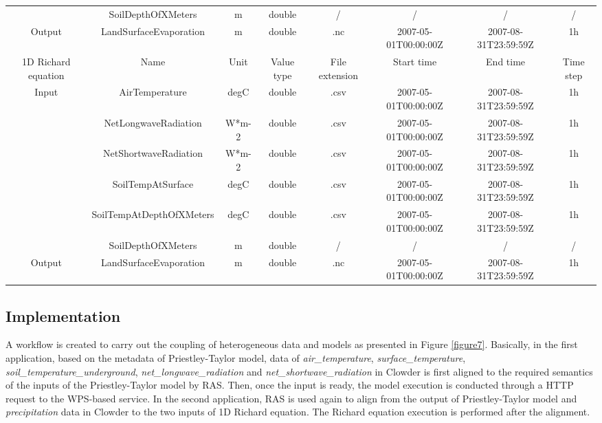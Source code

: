 \documentclass[review]{elsarticle}
\begin{document}
\begin{landscape}
\begin{table}[h]
\begin{tabular}{*8c}
							  &SoilDepthOfXMeters	           & m           & double    & /        & /								  & /								    & /      \\
Output                      &LandSurfaceEvaporation       & m           & double    & .nc     & 2007-05-01T00:00:00Z & 2007-08-31T23:59:59Z & 1h       \\
\midrule
1D Richard equation&Name&Unit &Value type&File extension & Start time & End time & Time step                      \\
\midrule
\multirow{6}{*}{Input}&AirTemperature                     & degC     & double    & .csv   & 2007-05-01T00:00:00Z & 2007-08-31T23:59:59Z & 1h       \\
							  &NetLongwaveRadiation        & W*m-2   & double    & .csv   & 2007-05-01T00:00:00Z & 2007-08-31T23:59:59Z & 1h       \\
							  &NetShortwaveRadiation        & W*m-2  & double    & .csv   & 2007-05-01T00:00:00Z & 2007-08-31T23:59:59Z & 1h       \\
							  &SoilTempAtSurface               & degC     & double    & .csv   & 2007-05-01T00:00:00Z & 2007-08-31T23:59:59Z & 1h       \\
							  &SoilTempAtDepthOfXMeters & degC     & double    & .csv   & 2007-05-01T00:00:00Z & 2007-08-31T23:59:59Z & 1h       \\
							  &SoilDepthOfXMeters	           & m           & double    & /        & /								  & /								    & /      \\
Output                      &LandSurfaceEvaporation       & m           & double    & .nc     & 2007-05-01T00:00:00Z & 2007-08-31T23:59:59Z & 1h       \\
\bottomrule
\end{tabular}
\end{table}
\end{landscape}

\subsection{Implementation} A workflow is created to carry out the coupling of heterogeneous data and models as presented in Figure \ref{figure7}. Basically, in the first application, based on the metadata of Priestley-Taylor model, data of \textit{air\_temperature}, \textit{surface\_temperature}, \textit{soil\_temperature\_underground}, \textit{net\_longwave\_radiation}  and \textit{net\_shortwave\_radiation} in Clowder is first aligned to the required semantics of the inputs of the Priestley-Taylor model by RAS. Then, once the input is ready, the model execution is conducted through a HTTP request to the WPS-based service. In the second application, RAS is used again to align from the output of Priestley-Taylor model and \textit{precipitation} data in Clowder to the two inputs of 1D Richard equation. The Richard equation execution is performed after the alignment.
\end{document}
